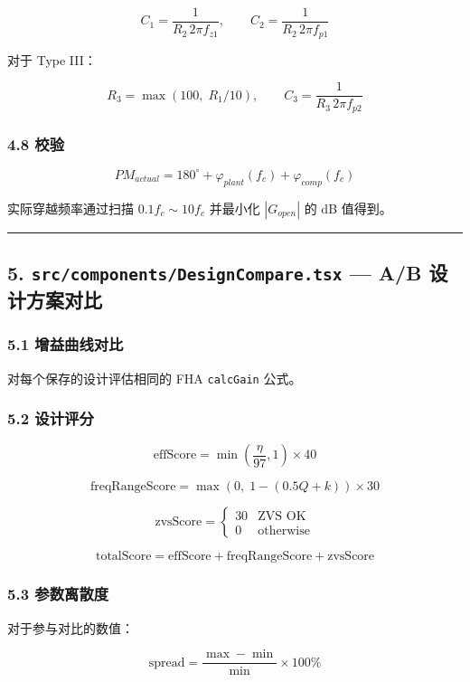\documentclass[UTF8]{ctexart}
\begin{document}
\[
C_1 = \frac{1}{R_2 \, 2\pi f_{z1}},\qquad
C_2 = \frac{1}{R_2 \, 2\pi f_{p1}}
\]

对于 Type III：

\[
R_3 = \max(100,\; R_1/10),\qquad
C_3 = \frac{1}{R_3 \, 2\pi f_{p2}}
\]

\subsubsection*{4.8 校验}

\[
PM_{actual} = 180^{\circ} + \varphi_{plant}(f_c) + \varphi_{comp}(f_c)
\]

实际穿越频率通过扫描 \(0.1 f_c \sim 10 f_c\) 并最小化 \(|G_{open}|\) 的 dB 值得到。

\noindent\rule{\textwidth}{0.4pt}

\subsection*{5. \texttt{src/components/DesignCompare.tsx} — A/B 设计方案对比}

\subsubsection*{5.1 增益曲线对比}

对每个保存的设计评估相同的 FHA \texttt{calcGain} 公式。

\subsubsection*{5.2 设计评分}

\[
\text{effScore} = \min\left(\frac{\eta}{97}, 1\right) \times 40
\]

\[
\text{freqRangeScore} = \max\left(0,\; 1 - (0.5 Q + k)\right) \times 30
\]

\[
\text{zvsScore} = \begin{cases} 30 & \text{ZVS OK} \\ 0 & \text{otherwise} \end{cases}
\]

\[
\text{totalScore} = \text{effScore} + \text{freqRangeScore} + \text{zvsScore}
\]

\subsubsection*{5.3 参数离散度}

对于参与对比的数值：

\[
\text{spread} = \frac{\max - \min}{\min} \times 100\%
\]
\end{document}
